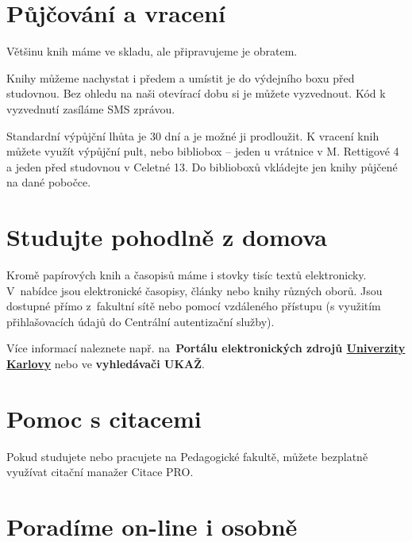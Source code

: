 \section{Půjčování a vracení }

Většinu knih máme ve skladu, ale připravujeme je obratem.

Knihy můžeme nachystat i předem a umístit je do výdejního boxu před studovnou.
Bez ohledu na naši otevírací dobu si je můžete vyzvednout. Kód k vyzvednutí
zasíláme SMS zprávou.

Standardní výpůjční lhůta je 30 dní a je možné ji prodloužit. 
K vracení knih
můžete využít výpůjční pult, nebo bibliobox -- jeden u vrátnice v M. Rettigové 4 a jeden před
studovnou v Celetné 13. Do biblioboxů vkládejte jen knihy půjčené na dané pobočce.




\ikonka{\faBed}
\section{Studujte pohodlně z domova}
Kromě papírových knih a časopisů máme i
stovky tisíc textů elektronicky.  V~nabídce jsou elektronické
časopisy, články nebo knihy různých oborů. Jsou dostupné přímo
z~fakultní sítě nebo pomocí vzdáleného přístupu (s využitím
přihlašovacích údajů do Centrální autentizační služby).

Více informací naleznete např. na~\textbf{Portálu elektronických zdrojů
  {\href{https://ezdroje.cuni.cz}{Univerzity Karlovy}}} nebo ve \textbf{vyhledávači UKAŽ}.

\ikonka{\faAndroid}
\section{Pomoc s citacemi}

Pokud studujete nebo pracujete na Pedagogické fakultě, můžete bezplatně
využívat citační manažer Citace PRO. 

\ikonka{\faInfoCircle}
\section{Poradíme on-line i osobně} 


